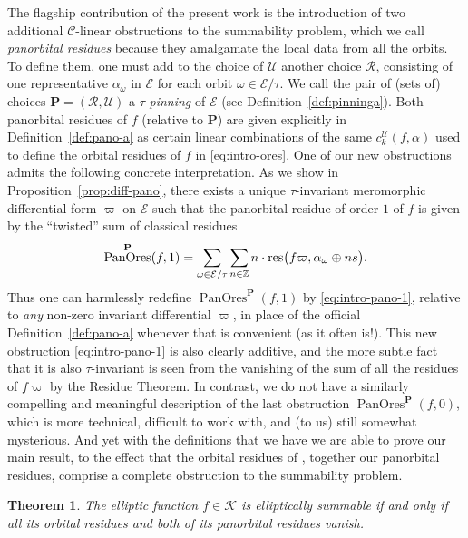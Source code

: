 \documentclass[preprint,12pt]{elsarticle}
\numberwithin{equation}{section} %
\theoremstyle{theorem}
\newtheorem{theorem}{Theorem}[section]
\theoremstyle{definition}
\newcommand{\Ca}{\mathcal{C}} %
\newcommand{\bk}{\mathcal{K}} %
\newcommand{\ec}{\mathcal{E}} %
\newcommand{\orbita}{{\ec/\tau}} %
\newcommand{\Z}{\mathbb{Z}} %
\DeclareMathOperator{\pano}{PanOres}
\begin{document}
The flagship contribution of the present work is the introduction of two additional $\Ca$-linear obstructions to the summability problem, which we call \emph{panorbital residues} because they amalgamate the local data from all the orbits. To define them, one must add to the choice of $\mathcal{U}$ another choice $\mathcal{R}$, consisting of one representative $\alpha_\omega$ in $\ec$ for each orbit $\omega\in\orbita$. We call the pair of (sets of) choices $\mathbf{P}=(\mathcal{R},\mathcal{U})$ a $\tau$-\emph{pinning} of $\ec$ (see Definition~\ref{def:pinninga}). Both panorbital residues of $f$ (relative to $\mathbf{P}$) are given explicitly in Definition~\ref{def:pano-a} as certain linear combinations of the same $c^\mathcal{U}_k(f,\alpha)$ used to define the orbital residues of $f$ in \eqref{eq:intro-ores}. One of our new obstructions admits the following concrete interpretation. As we show in Proposition~\ref{prop:diff-pano}, there exists a unique $\tau$-invariant meromorphic differential form $\varpi$ on $\ec$ such that the panorbital residue of order $1$ of $f$ is given by the ``twisted'' sum of classical residues \vspace{-.04in}\begin{equation}\label{eq:intro-pano-1}
    \pano^\mathbf{P}(f,1)=\sum_{\omega\in\orbita}\sum_{n\in\Z}n\cdot\mathrm{res}\bigl(f\varpi,\alpha_\omega\oplus ns\bigr).\vspace{-.04in}
\end{equation} Thus one can harmlessly redefine $\pano^\mathbf{P}(f,1)$ by \eqref{eq:intro-pano-1}, relative to \emph{any} non-zero invariant differential $\varpi$, in place of the official Definition~\ref{def:pano-a} whenever that is convenient (as it often is!). This new obstruction \eqref{eq:intro-pano-1} is also clearly additive, and the more subtle fact that it is also $\tau$-invariant is seen from the vanishing of the sum of all the residues of $f\varpi$ by the Residue Theorem. In contrast, we do not have a similarly compelling and meaningful description of the last obstruction $\pano^\mathbf{P}(f,0)$, which is more technical, difficult to work with, and (to us) still somewhat mysterious. And yet with the definitions that we have we are able to prove our main result, to the effect that the orbital residues of \cite{Dreyfus2018}, together our panorbital residues, comprise a complete obstruction to the summability problem.

\begin{theorem}\label{thm:main}
    The elliptic function $f\in\bk$ is elliptically summable if and only if all its orbital residues and both of its panorbital residues vanish.
\end{theorem}
\end{document}
